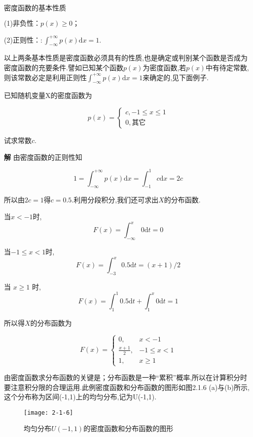$ 密度函数的基本性质 $

(1)非负性：$p(x) \geqslant 0$；

(2)正则性：$: \int_{-\infty}^{+\infty} p(x) \mathrm{d} x=1$.

以上两条基本性质是密度函数必须具有的性质,也是确定或判别某个函数是否成为密度函数的充要条件.譬如已知某个函数$ p(x) $为密度函数,若$ p(x) $中有待定常数,则该常数必定是利用正则性$\int_{-\infty}^{+\infty} p(x) \mathrm{d} x=1$来确定的,见下面例子.

\begin{example}
	已知随机变量X的密度函数为
	
	\[ 
	p(x)=\left\{\begin{array}{ll}
	{c,-1 \leqslant x \leqslant 1} \\ 
	{0,\text{其它}}
	\end{array}\right.
	\]
	
	试求常数$ c $.
	
	\textbf{解} 由密度函数的正则性知
	
	\[ 
	1=\int_{-\infty}^{+\infty} p(x) \mathrm{d} x=\int_{-1}^{1} c \mathrm{d} x=2 c
	\]
	
	所以由$ 2c=1 $得$ c=0.5 $.利用分段积分,我们还可求出$ X $的分布函数.
	
	当$ x<-1 $时,
	\[ 
	F(x)=\int_{-\infty}^{x} 0 \mathrm{d} t=0
	\]
	
	当$-1 \leqslant x<1$时,
	\[ 
	F(x)=\int_{-3}^{x} 0.5 \mathrm{d} t=(x+1) / 2
	\]
	
	当 $x \geqslant 1$ 时,
	\[ 
	F(x)=\int_{1}^{1} 0.5 \mathrm{d} t+\int_{1}^{x} 0 \mathrm{d} t=1
	\]
	
	所以得$ X $的分布函数为
	
	\[ 
	F(x)=\left\{\begin{array}{ll}
	{0,} & {x<-1} \\ 
	{\frac{x+1}{2},} & {-1 \leqslant x<1} \\ 
	{1,} & {x \geqslant 1}
	\end{array}\right.
	\]
	
\end{example}


由密度函数求分布函数的关键是；分布函数是一种“累积”概率,所以在计算积分时要注意积分限的合理运用.此例密度函数和分布函数的图形如图2.1.6
(a)与(b)所示,这个分布称为区间(-1,1)上的均匀分布,记为U(-1,1).

\begin{figure}
	\centering
	\texttt{[image: 2-1-6]}
	\caption{均匀分布$U(-1,1)$的密度函数和分布函数的图形}
	\label{fig:2-1-6}
\end{figure}

